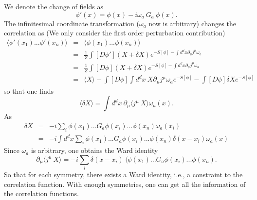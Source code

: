 \documentclass[submission, PhysLectNotes]{SciPost}
\begin{document}
We denote the change of fields as
\begin{equation}
    \phi'(x) = \phi(x) -i\omega_a\ G_a\ \phi(x).
\end{equation}
The infinitesimal coordinate transformation ($\omega_a$ now is arbitrary) changes the correlation as (We only consider the first order perturbation contribution) 
\begin{eqnarray}
\langle \phi'(x_1)... \phi'(x_n)\rangle &=& \langle \phi(x_1)... \phi(x_n)\rangle \\ 
&=& \frac{1}{Z} \int [D\phi'] (X+\delta X) e^{-S[\phi] - \int d^dx\partial_\mu j^\mu \omega_a} \\
&=& \frac{1}{Z} \int [D\phi] (X+\delta X) e^{-S[\phi] - \int d^dx\partial_\mu j^\mu \omega_a} \\
&=& \langle X \rangle - \int [D\phi] \int d^dx\ X \partial_\mu j^\mu \omega_a e^{-S[\phi]} - \int [D\phi] \delta X  e^{-S[\phi]}
\end{eqnarray}
so that one finds
\begin{equation}
    \langle\delta X\rangle = \int d^dx \ \partial_\mu\langle j^\mu \ X\rangle \omega_a(x).
\end{equation}
As
\begin{eqnarray}
\delta X &=& -i \sum_i \phi(x_1)...G_a \phi(x_i)...\phi(x_n)\omega_a(x_i) \\
&=& -i \int d^dx \sum_i \phi(x_1)...G_a \phi(x_i)...\phi(x_n)\delta(x-x_i)\omega_a(x)
\end{eqnarray}
Since $\omega_a$ is arbitrary, one obtains the Ward identity
\begin{equation}
    \partial_\mu\langle j^\mu \ X\rangle = -i \sum_i \delta(x-x_i)\ \langle \phi(x_1)...G_a \phi(x_i)...\phi(x_n).
\end{equation}
So that for each symmetry, there exists a Ward identity, i.e., a constraint to the correlation function. With enough symmetries, one can get all the information of the correlation functions.
\end{document}
